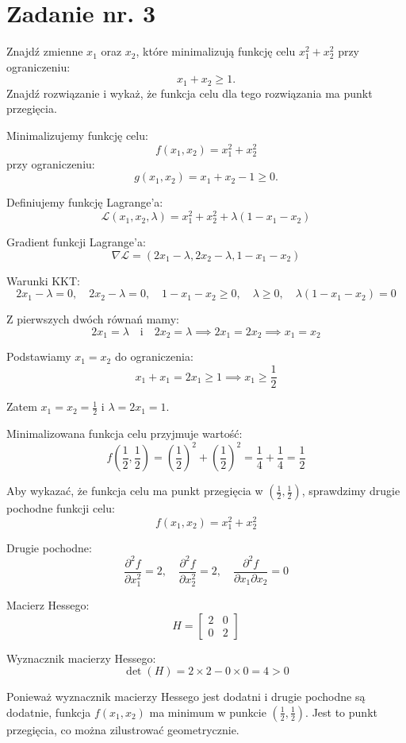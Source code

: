\documentclass{article}
\begin{document}
\section{Zadanie nr. 3}
Znajdź zmienne \(x_1\) oraz \(x_2\), które minimalizują funkcję celu \(x_1^2 + x_2^2\) przy ograniczeniu:
\[
x_1 + x_2 \geq 1.
\]
Znajdź rozwiązanie i wykaż, że funkcja celu dla tego rozwiązania ma punkt przegięcia.

Minimalizujemy funkcję celu:
\[
f(x_1, x_2) = x_1^2 + x_2^2
\]
przy ograniczeniu:
\[
g(x_1, x_2) = x_1 + x_2 - 1 \geq 0.
\]

Definiujemy funkcję Lagrange'a:
\[
\mathcal{L}(x_1, x_2, \lambda) = x_1^2 + x_2^2 + \lambda (1 - x_1 - x_2)
\]

Gradient funkcji Lagrange'a:
\[
\nabla \mathcal{L} = \left( 2x_1 - \lambda, 2x_2 - \lambda, 1 - x_1 - x_2 \right)
\]

Warunki KKT:
\[
2x_1 - \lambda = 0, \quad 2x_2 - \lambda = 0, \quad 1 - x_1 - x_2 \geq 0, \quad \lambda \geq 0, \quad \lambda (1 - x_1 - x_2) = 0
\]

Z pierwszych dwóch równań mamy:
\[
2x_1 = \lambda \quad \text{i} \quad 2x_2 = \lambda \implies 2x_1 = 2x_2 \implies x_1 = x_2
\]

Podstawiamy \( x_1 = x_2 \) do ograniczenia:
\[
x_1 + x_1 = 2x_1 \geq 1 \implies x_1 \geq \frac{1}{2}
\]

Zatem \( x_1 = x_2 = \frac{1}{2} \) i \(\lambda = 2x_1 = 1\).


Minimalizowana funkcja celu przyjmuje wartość:
\[
f\left(\frac{1}{2}, \frac{1}{2}\right) = \left(\frac{1}{2}\right)^2 + \left(\frac{1}{2}\right)^2 = \frac{1}{4} + \frac{1}{4} = \frac{1}{2}
\]


Aby wykazać, że funkcja celu ma punkt przegięcia w \( \left( \frac{1}{2}, \frac{1}{2} \right) \), sprawdzimy drugie pochodne funkcji celu:
\[
f(x_1, x_2) = x_1^2 + x_2^2
\]

Drugie pochodne:
\[
\frac{\partial^2 f}{\partial x_1^2} = 2, \quad \frac{\partial^2 f}{\partial x_2^2} = 2, \quad \frac{\partial^2 f}{\partial x_1 \partial x_2} = 0
\]

Macierz Hessego:
\[
H = \begin{bmatrix}
2 & 0 \\
0 & 2
\end{bmatrix}
\]

Wyznacznik macierzy Hessego:
\[
\det(H) = 2 \times 2 - 0 \times 0 = 4 > 0
\]

Ponieważ wyznacznik macierzy Hessego jest dodatni i drugie pochodne są dodatnie, funkcja \( f(x_1, x_2) \) ma minimum w punkcie \( \left( \frac{1}{2}, \frac{1}{2} \right) \). Jest to punkt przegięcia, co można zilustrować geometrycznie.
\end{document}
